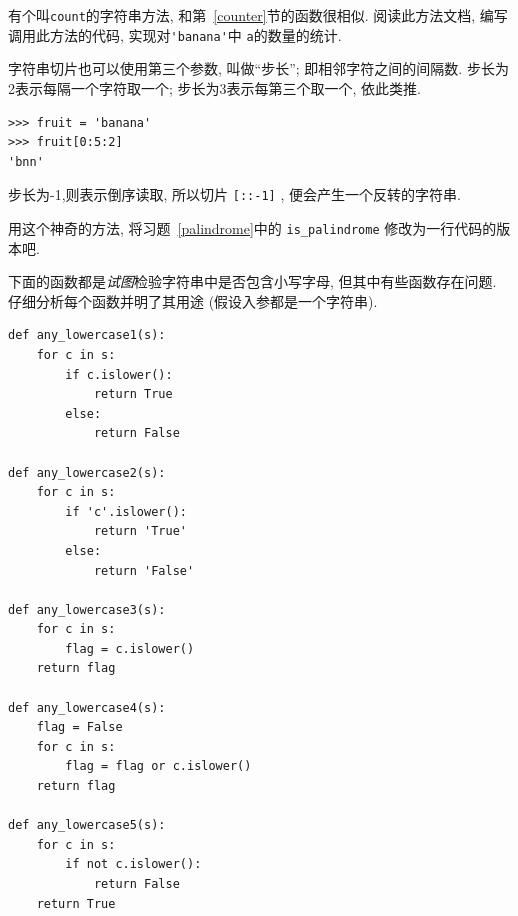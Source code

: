 \documentclass[10pt]{book}
\begin{document}
\begin{exercise}


有个叫{\tt count}的字符串方法, 和第~\ref{counter}节的函数很相似. 
阅读此方法文档, 编写调用此方法的代码, 实现对\verb"'banana'"中
{\tt a}的数量的统计.
\end{exercise}


\begin{exercise}

字符串切片也可以使用第三个参数, 叫做``步长'';
即相邻字符之间的间隔数. 
步长为2表示每隔一个字符取一个;
步长为3表示每第三个取一个, 依此类推. 

\begin{verbatim}
>>> fruit = 'banana'
>>> fruit[0:5:2]
'bnn'
\end{verbatim}
步长为-1,则表示倒序读取, 所以切片 \verb"[::-1]" , 
便会产生一个反转的字符串. 

用这个神奇的方法, 将习题~\ref{palindrome}中的 \verb"is_palindrome"
修改为一行代码的版本吧. 
\end{exercise}


\begin{exercise}
下面的函数都是{\em 试图}检验字符串中是否包含小写字母, 
但其中有些函数存在问题. 
仔细分析每个函数并明了其用途
(假设入参都是一个字符串).

\begin{verbatim}
def any_lowercase1(s):
    for c in s:
        if c.islower():
            return True
        else:
            return False

def any_lowercase2(s):
    for c in s:
        if 'c'.islower():
            return 'True'
        else:
            return 'False'

def any_lowercase3(s):
    for c in s:
        flag = c.islower()
    return flag

def any_lowercase4(s):
    flag = False
    for c in s:
        flag = flag or c.islower()
    return flag

def any_lowercase5(s):
    for c in s:
        if not c.islower():
            return False
    return True
\end{verbatim}

\end{exercise}
\end{document}
